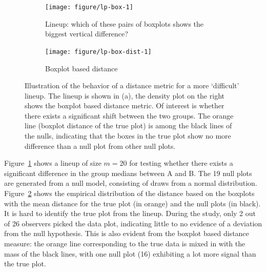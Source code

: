 \documentclass[12pt]{article}\usepackage[]{graphicx}\usepackage[]{color}
\newenvironment{knitrout}{}{} %
\begin{document}
\begin{figure}[!p]
\centering
\begin{subfigure}[b]{0.55\textwidth}
\caption{\label{box-1}Lineup: which of these pairs of boxplots shows the biggest vertical difference?}
\begin{knitrout}
\color{fgcolor}
\texttt{[image: figure/lp-box-1]} 

\end{knitrout}
\end{subfigure}
\begin{subfigure}[b]{0.44\textwidth}
\caption{\label{box-2}Boxplot based distance}




\begin{knitrout}
\color{fgcolor}
\texttt{[image: figure/lp-box-dist-1]} 

\end{knitrout}
\end{subfigure}
	\vspace{-.3in}
\caption{\label{fig:boxes} Illustration of the behavior of a distance metric for a more `difficult' lineup. The lineup is shown in (a), the density plot on the right shows the boxplot based distance metric. Of interest is whether there exists a significant shift between the two groups. The orange line (boxplot distance of the true plot) is among the black lines of the nulls, indicating that the boxes in the true plot show no more difference than a null plot from other null plots. }
\end{figure}

Figure~\ref{box-1} shows a lineup of size $m = 20$ for testing whether there exists a significant difference in the group medians between A and B. The 19 null plots are generated from a null model, consisting of draws from a normal distribution.  Figure~\ref{box-2} shows the empirical distribution of the distance based on the boxplots with the mean distance for the true plot (in orange) and the null plots (in black). It is hard to identify the true plot from the lineup. During the study, only 2 out of 26 observers picked the data plot, indicating little to no evidence of a deviation from the null hypothesis. This  is also evident from the boxplot based distance measure: the orange line corresponding to the true data is mixed in with the mass of the black lines, with one null plot (16) exhibiting a lot more signal than the true plot.
\end{document}
